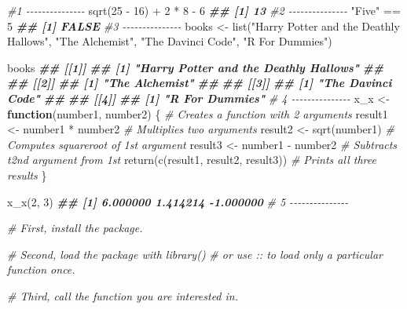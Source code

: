 \documentclass[
]{book}
\newenvironment{Shaded}{\begin{snugshade}}{\end{snugshade}}
\newcommand{\CommentTok}[1]{\textcolor[rgb]{0.56,0.35,0.01}{\textit{#1}}}
\newcommand{\ControlFlowTok}[1]{\textcolor[rgb]{0.13,0.29,0.53}{\textbf{#1}}}
\newcommand{\DecValTok}[1]{\textcolor[rgb]{0.00,0.00,0.81}{#1}}
\newcommand{\DocumentationTok}[1]{\textcolor[rgb]{0.56,0.35,0.01}{\textbf{\textit{#1}}}}
\newcommand{\FunctionTok}[1]{\textcolor[rgb]{0.00,0.00,0.00}{#1}}
\newcommand{\NormalTok}[1]{#1}
\newcommand{\OtherTok}[1]{\textcolor[rgb]{0.56,0.35,0.01}{#1}}
\newcommand{\SpecialCharTok}[1]{\textcolor[rgb]{0.00,0.00,0.00}{#1}}
\newcommand{\StringTok}[1]{\textcolor[rgb]{0.31,0.60,0.02}{#1}}
\begin{document}
\begin{Shaded}
\begin{Highlighting}[]
\CommentTok{\#1 {-}{-}{-}{-}{-}{-}{-}{-}{-}{-}{-}{-}{-}{-}{-}}
\FunctionTok{sqrt}\NormalTok{(}\DecValTok{25} \SpecialCharTok{{-}} \DecValTok{16}\NormalTok{) }\SpecialCharTok{+} \DecValTok{2} \SpecialCharTok{*} \DecValTok{8} \SpecialCharTok{{-}} \DecValTok{6}
\DocumentationTok{\#\# [1] 13}
\CommentTok{\#2 {-}{-}{-}{-}{-}{-}{-}{-}{-}{-}{-}{-}{-}{-}{-}}
\StringTok{"Five"} \SpecialCharTok{==} \DecValTok{5}
\DocumentationTok{\#\# [1] FALSE}
\CommentTok{\#3 {-}{-}{-}{-}{-}{-}{-}{-}{-}{-}{-}{-}{-}{-}{-}}
\NormalTok{books }\OtherTok{\textless{}{-}} \FunctionTok{list}\NormalTok{(}\StringTok{"Harry Potter and the Deathly Hallows"}\NormalTok{,}
              \StringTok{"The Alchemist"}\NormalTok{,}
              \StringTok{"The Davinci Code"}\NormalTok{,}
              \StringTok{"R For Dummies"}\NormalTok{)}

\NormalTok{books}
\DocumentationTok{\#\# [[1]]}
\DocumentationTok{\#\# [1] "Harry Potter and the Deathly Hallows"}
\DocumentationTok{\#\# }
\DocumentationTok{\#\# [[2]]}
\DocumentationTok{\#\# [1] "The Alchemist"}
\DocumentationTok{\#\# }
\DocumentationTok{\#\# [[3]]}
\DocumentationTok{\#\# [1] "The Davinci Code"}
\DocumentationTok{\#\# }
\DocumentationTok{\#\# [[4]]}
\DocumentationTok{\#\# [1] "R For Dummies"}
\CommentTok{\# 4 {-}{-}{-}{-}{-}{-}{-}{-}{-}{-}{-}{-}{-}{-}{-}}
\NormalTok{x\_x }\OtherTok{\textless{}{-}} \ControlFlowTok{function}\NormalTok{(number1, number2) \{    }\CommentTok{\# Creates a function with 2 arguments}
\NormalTok{  result1 }\OtherTok{\textless{}{-}}\NormalTok{ number1 }\SpecialCharTok{*}\NormalTok{ number2         }\CommentTok{\# Multiplies two arguments}
\NormalTok{  result2 }\OtherTok{\textless{}{-}} \FunctionTok{sqrt}\NormalTok{(number1)             }\CommentTok{\# Computes squareroot of 1st argument}
\NormalTok{  result3 }\OtherTok{\textless{}{-}}\NormalTok{ number1 }\SpecialCharTok{{-}}\NormalTok{ number2         }\CommentTok{\# Subtracts t2nd argument from 1st}
  \FunctionTok{return}\NormalTok{(}\FunctionTok{c}\NormalTok{(result1, result2, result3)) }\CommentTok{\# Prints all three results}
\NormalTok{\}}

\FunctionTok{x\_x}\NormalTok{(}\DecValTok{2}\NormalTok{, }\DecValTok{3}\NormalTok{)}
\DocumentationTok{\#\# [1]  6.000000  1.414214 {-}1.000000}
\CommentTok{\# 5 {-}{-}{-}{-}{-}{-}{-}{-}{-}{-}{-}{-}{-}{-}{-}}

\CommentTok{\# First, install the package.}

\CommentTok{\# Second, load the package with \textquotesingle{}library()\textquotesingle{}}
\CommentTok{\#         or use \textquotesingle{}::\textquotesingle{} to load only a particular function once.}

\CommentTok{\# Third, call the function you are interested in.}
\end{Highlighting}
\end{Shaded}


  
\end{document}
